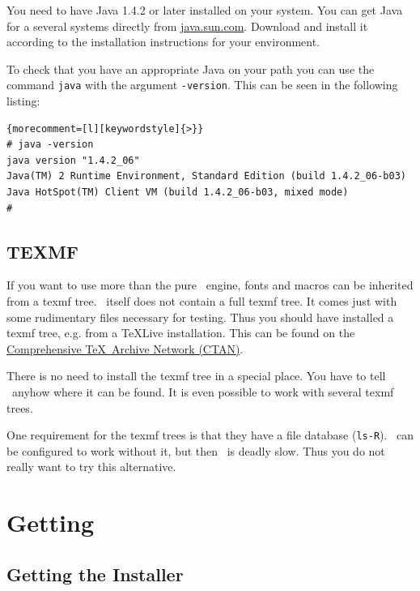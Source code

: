 \documentclass{extex-doc}
\makeatletter
\newcommand\File[1]{\texttt{#1}\index{#1@\textsf{#1}}}
\makeatother
\begin{document}
You need to have Java 1.4.2 or later installed on your
system. You can get Java for a several systems directly from
\url{java.sun.com}. Download and install it according to the
installation instructions for your environment.

To check that you have an appropriate Java on your path you can use
the command \texttt{java} with the argument \texttt{-version}. This
can be seen in the following listing:

%
\begin{lstlisting}{morecomment=[l][keywordstyle]{>}}
# java -version
java version "1.4.2_06"
Java(TM) 2 Runtime Environment, Standard Edition (build 1.4.2_06-b03)
Java HotSpot(TM) Client VM (build 1.4.2_06-b03, mixed mode)
#
\end{lstlisting}


\subsection{TEXMF}

If you want to use more than the pure \ExTeX\ engine, fonts and macros
can be inherited from a texmf tree. \ExTeX\ itself does
not contain a full texmf tree. It comes just with some rudimentary
files necessary for testing. Thus you should have installed a texmf
tree, e.g. from a \TeX Live installation.
This can be found on the \href{http://www.ctan.org}{Comprehensive
  \TeX\ Archive Network (CTAN)}.

There is no need to install the texmf tree in a special place. You
have to tell \ExTeX\ anyhow where it can be found. It is even possible
to work with several texmf trees.

One requirement for the texmf trees is that they have a file database
(\File{ls-R}). \ExTeX\ can be configured to work without it, but then
\ExTeX\ is deadly slow. Thus you do not really want to try this
alternative.


\section{Getting \ExTeX}

\subsection{Getting the Installer}
\end{document}

